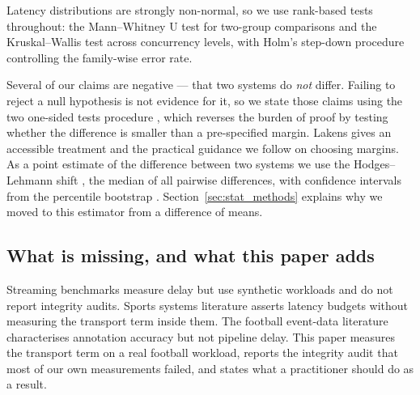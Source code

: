 \documentclass[Afour,sageh,times]{sagej}
\begin{document}
Latency distributions are strongly non-normal, so we use rank-based tests throughout: the
Mann--Whitney U test \cite{mann1947test} for two-group comparisons and the Kruskal--Wallis test
\cite{kruskal1952use} across concurrency levels, with Holm's step-down procedure
\cite{holm1979simple} controlling the family-wise error rate.

Several of our claims are negative --- that two systems do \emph{not} differ. Failing to reject a
null hypothesis is not evidence for it, so we state those claims using the two one-sided tests
procedure \cite{schuirmann1987tost}, which reverses the burden of proof by testing whether the
difference is smaller than a pre-specified margin. Lakens \cite{lakens2017equivalence} gives an
accessible treatment and the practical guidance we follow on choosing margins. As a point
estimate of the difference between two systems we use the Hodges--Lehmann shift
\cite{hodges1963estimates}, the median of all pairwise differences, with confidence intervals
from the percentile bootstrap \cite{efron1979bootstrap}. Section~\ref{sec:stat_methods} explains
why we moved to this estimator from a difference of means.

\subsection{What is missing, and what this paper adds}

Streaming benchmarks measure delay but use synthetic workloads and do not report integrity
audits. Sports systems literature asserts latency budgets without measuring the transport term
inside them. The football event-data literature characterises annotation accuracy but not
pipeline delay. This paper measures the transport term on a real football workload, reports the
integrity audit that most of our own measurements failed, and states what a practitioner should
do as a result.
\end{document}
